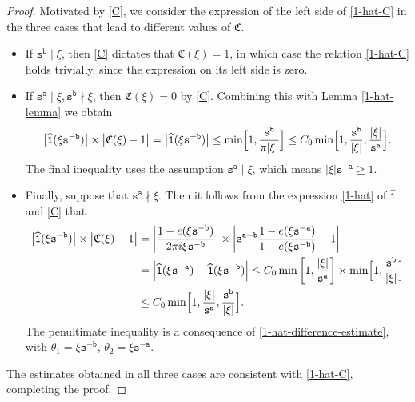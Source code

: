 \documentclass[12pt, twoside]{article}
\theoremstyle{definition}
\numberwithin{equation}{section}
\begin{document}
\begin{proof} 
Motivated by \eqref{C}, we consider the expression of the left side of \eqref{1-hat-C} in the three cases that lead to different values of $\mathfrak C$.
\begin{itemize} 
\item If $\mathtt s^{\mathtt b} \mid \xi$, then \eqref{C} dictates that $\mathfrak C(\xi) = 1$, in which case the relation \eqref{1-hat-C} holds trivially, since the expression on its left side is zero. 
\item  If $\mathtt s^{\mathtt a} \mid \xi, \mathtt s^{\mathtt b} \nmid \xi$, then $\mathfrak C(\xi) = 0$ by \eqref{C}. Combining this with Lemma \ref{1-hat-lemma} we obtain 
\[ \bigl|\widehat{\mathtt 1}(\xi \mathtt s^{-\mathtt b}) \bigr| \times \bigl|\mathfrak C(\xi) - 1\bigr| =  \bigl|\widehat{\mathtt 1}(\xi \mathtt s^{-\mathtt b}) \bigr| \leq  \min \Bigl[1, \frac{\mathtt s^{\mathtt b}}{\pi |\xi|} \Bigr] \leq C_0   \min \Bigl[1, \frac{\mathtt s^{\mathtt b}}{|\xi|}, \frac{|\xi|}{\mathtt s^{\mathtt a}} \Bigr]. \] 
The final inequality uses the assumption $\mathtt s^{\mathtt a} \mid \xi$, which means $|\xi| \mathtt s^{-\mathtt a} \geq 1$. 
\item Finally, suppose that $\mathtt s^{\mathtt a} \nmid \xi$. Then it follows from the expression \eqref{1-hat} of $\widehat{\mathtt 1}$ and \eqref{C} that 
\begin{align*} 
\bigl|\widehat{\mathtt 1}(\xi \mathtt s^{-\mathtt b}) \bigr| \times \bigl|\mathfrak C(\xi) - 1\bigr| &= \left| \frac{1 - e(\xi \mathtt s^{-\mathtt b})}{2 \pi i \xi \mathtt s^{-\mathtt b}}\right| \times \left| \mathtt s^{\mathtt a - \mathtt b} \frac{1 - e(\xi \mathtt s^{-\mathtt a})}{1 - e(\xi \mathtt s^{-\mathtt b})} - 1 \right| \\ 
&= \Bigl| \widehat{\mathtt 1}(\xi \mathtt s^{-\mathtt a}) - \widehat{\mathtt 1}(\xi \mathtt s^{-\mathtt b})\Bigr|  \leq C_0 \min \left[1, \frac{|\xi|}{\mathtt s^{\mathtt a}}\right] \times \min \Bigl[1, \frac{\mathtt s^{\mathtt b}}{|\xi|} \Bigr] \\
&\leq C_0 \min \Bigl[1, \frac{|\xi|}{\mathtt s^{\mathtt a}}, \frac{\mathtt s^{\mathtt b}}{|\xi|} \Bigr].
\end{align*} 
The penultimate inequality is a consequence of \eqref{1-hat-difference-estimate}, with $\theta_1 = \xi \mathtt s^{-\mathtt b}$, $\theta_2 = \xi \mathtt s^{-\mathtt a}$.  
\end{itemize} 
The estimates obtained in all three cases are consistent with \eqref{1-hat-C}, completing the proof. 
\end{proof} 
\end{document}
